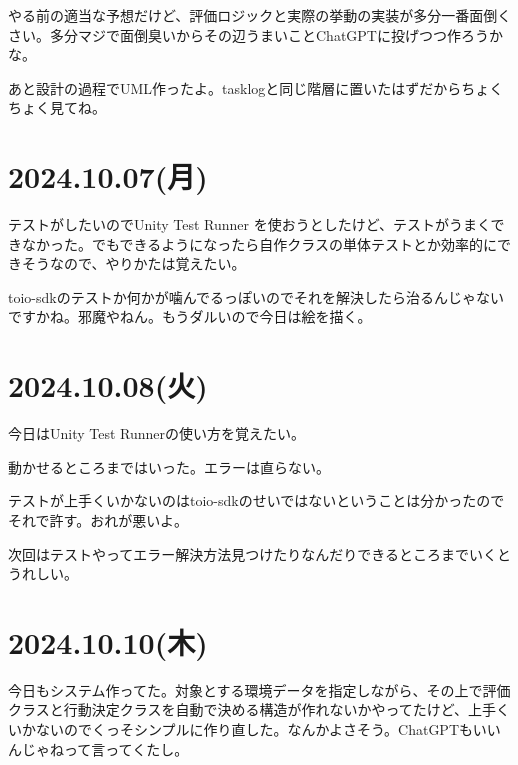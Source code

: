 \documentclass[fleqn,twocolumn]{mynote}
\begin{document}
  やる前の適当な予想だけど、評価ロジックと実際の挙動の実装が多分一番面倒くさい。多分マジで面倒臭いからその辺うまいことChatGPTに投げつつ作ろうかな。

  あと設計の過程でUML作ったよ。tasklogと同じ階層に置いたはずだからちょくちょく見てね。

  \section*{2024.10.07(月)}
  テストがしたいのでUnity Test Runner
  を使おうとしたけど、テストがうまくできなかった。でもできるようになったら自作クラスの単体テストとか効率的にできそうなので、やりかたは覚えたい。

  toio-sdkのテストか何かが噛んでるっぽいのでそれを解決したら治るんじゃないですかね。邪魔やねん。もうダルいので今日は絵を描く。

  \section*{2024.10.08(火)}
  今日はUnity Test Runnerの使い方を覚えたい。

  動かせるところまではいった。エラーは直らない。

  テストが上手くいかないのはtoio-sdkのせいではないということは分かったのでそれで許す。おれが悪いよ。

  次回はテストやってエラー解決方法見つけたりなんだりできるところまでいくとうれしい。

  \section*{2024.10.10(木)}
  今日もシステム作ってた。対象とする環境データを指定しながら、その上で評価クラスと行動決定クラスを自動で決める構造が作れないかやってたけど、上手くいかないのでくっそシンプルに作り直した。なんかよさそう。ChatGPTもいいんじゃねって言ってくたし。

  \fboxsep=0pt            %
  \fboxrule=1pt            %
  \begin{figure}[h]
    \centering
    \caption{}
    \label{fig:}
  \end{figure}
\end{document}
